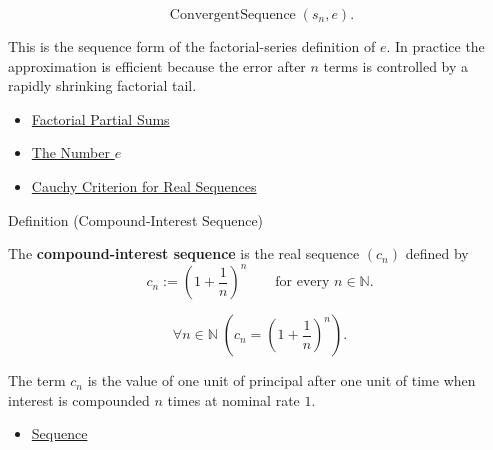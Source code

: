 \begin{remark*}
\[
\operatorname{ConvergentSequence}(s_n,e).
\]
\end{remark*}

\begin{remark*}[Interpretation]
This is the sequence form of the factorial-series definition of $e$. In
practice the approximation is efficient because the error after $n$ terms is
controlled by a rapidly shrinking factorial tail.
\end{remark*}

\begin{remark*}[Dependencies]\hfill
\begin{itemize}
  \item \hyperref[def:factorial-partial-sums]{Factorial Partial Sums}
  \item \hyperref[def:number-e]{The Number $e$}
  \item \hyperref[thm:cauchy-criterion-real-sequences]{Cauchy Criterion for Real Sequences}
\end{itemize}
\end{remark*}


\begin{definitionbox}{Definition (Compound-Interest Sequence)}
\begin{definition}
\label{def:compound-interest-sequence}
The \textbf{compound-interest sequence} is the real sequence $(c_n)$
defined by
\[
  c_n:=\left(1+\frac{1}{n}\right)^n
  \qquad\text{for every } n\in\mathbb{N}.
\]
\end{definition}
\end{definitionbox}

\begin{remark*}
\[
\forall n\in\mathbb{N}\;
\left(
  c_n=\left(1+\frac{1}{n}\right)^n
\right).
\]
\end{remark*}

\begin{remark*}[Interpretation]
The term $c_n$ is the value of one unit of principal after one unit of time
when interest is compounded $n$ times at nominal rate $1$.
\end{remark*}

\begin{remark*}[Dependencies]\hfill
\begin{itemize}
  \item \hyperref[def:sequence]{Sequence}
\end{itemize}
\end{remark*}

